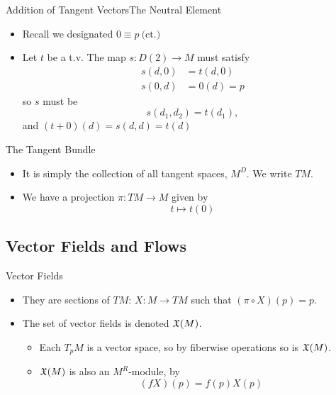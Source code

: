 \documentclass{beamer}
\begin{document}

\begin{frame}{Addition of Tangent Vectors}{The Neutral Element}
  \begin{itemize}
    \item Recall we designated \( 0\equiv p\ \text{(ct.)} \)
    \item Let \( t \) be a t.v. The map \( s:D(2)\to M \) must satisfy
      \begin{align*}
        s(d,0) &= t(d,0)\\
        s(0,d) &= 0(d) = p
      \end{align*}
      so \( s \) must be
      \begin{equation*}
        s(d_1,d_2) = t(d_1),
      \end{equation*}
      and \( (t + 0)(d) = s(d,d) = t(d) \)
  \end{itemize}
\end{frame}

\begin{frame}{The Tangent Bundle}
  \begin{itemize}
    \item It is simply the collection of all tangent spaces, \( M^D \). We write \( TM \).
    \item We have a projection \( \pi:TM\to M \) given by
      \begin{equation*}
        t\mapsto t(0)
      \end{equation*}
  \end{itemize}
\end{frame}

\subsection{Vector Fields and Flows}

\begin{frame}{Vector Fields}
  \begin{itemize}
    \item They are sections of \( TM \): \( X:M\to TM \) such that \( (\pi\circ X)(p) = p \).
    \item The set of vector fields is denoted \( \mathfrak X(M) \).
      \begin{itemize}
        \pause
        \item Each \( T_pM \) is a vector space, so by fiberwise operations so is \( \mathfrak X(M) \).
        \pause
        \item \( \mathfrak X(M) \) is also an \( M^R \)-module, by
          \begin{equation*}
            (fX)(p) = f(p)X(p)
          \end{equation*}
      \end{itemize}
  \end{itemize}
\end{frame}
\end{document}
